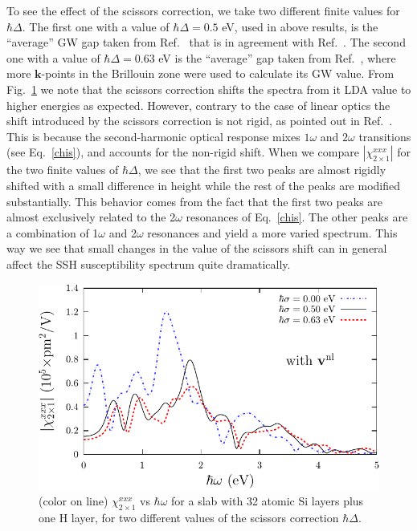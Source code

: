 \documentclass[floatfix,prb,aps,superscriptaddress,showpacs,11pt,preprint,letterpaper]{revtex4}
\begin{document}
To see the effect of the scissors correction, we take two different
finite values for $\hbar\Delta$. The first one
with a value of $\hbar\Delta=0.5$ eV, used in above results, 
is the ``average'' GW gap taken from 
Ref.~ 
that is in agreement with Ref.~. The second one
with a value of $\hbar\Delta=0.63$ eV is the ``average'' 
gap taken from Ref.~, 
where more $\mathbf{k}$-points in the Brillouin zone were 
used to calculate its GW value.
From Fig.~\ref{fig4}
we note that the scissors correction 
shifts the spectra from it LDA value to higher energies as expected.
 However, contrary 
to the case of linear optics\cite{cabellosPRB09} the shift introduced 
by the scissors correction is not 
rigid, as pointed out in Ref.~. 
 This is because the second-harmonic optical response mixes 
$1\omega$ and $2\omega$ transitions (see Eq.~\eqref{chis}), and accounts 
for the non-rigid shift. 
When we compare 
$|\chi^{xxx}_{2\times 1}|$ for the two finite values of $\hbar\Delta$,
we see that the first two peaks are almost rigidly 
shifted with a small difference in height while
the rest of the peaks are modified substantially. 
This behavior comes from the fact that the first two
peaks are almost exclusively related to the 
2$\omega$ resonances of
Eq.~\eqref{chis}. The other peaks are a combination 
of 1$\omega$ and 2$\omega$ resonances 
and yield a more varied spectrum. 
This way we see that small changes in the value of the 
scissors shift can in general affect the SSH susceptibility 
spectrum quite dramatically.
\begin{figure}
\centering 
\includegraphics[scale=.8]{plots/fig4}
\caption{(color on line) 
$\chi^{xxx}_{2\times 1}$
vs $\hbar\omega$ for a slab with 32 
atomic Si layers plus one H layer, 
for two different values of 
the scissors correction $\hbar\Delta$. 
\label{fig4}} 
\end{figure}
\end{document}
